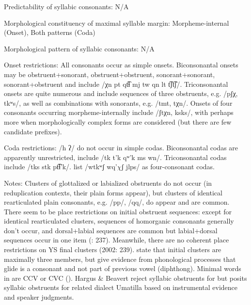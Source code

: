 {\begin{appendixdesc}
\item[Predictability of syllabic consonants:] N/A

\item[Morphological constituency of maximal syllable margin:] Morpheme-internal (Onset), Both patterns (Coda)

\item[Morphological pattern of syllabic consonants:] N/A

\item[Onset restrictions:] All consonants occur as simple onsets. Biconsonantal onsets may be obstruent+sonorant, obstruent+obstruent, sonorant+sonorant, sonorant+obstruent and include /χn pt qt͡ɬ mj tw qn lt t͡ʃt͡ʃ/. Triconsonantal onsets are quite numerous and include sequences of three obstruents, e.g. /pʃχ, tkʷs/, as well as combinations with sonorants, e.g. /tmt, tχn/. Onsets of four consonants occurring morpheme-internally include /ʃtχn, ksks/, with perhaps more when morphologically complex forms are considered (but there are few candidate prefixes).

\item[Coda restrictions:] /h ʔ/ do not occur in simple codas. Biconsonantal codas are apparently unrestricted, include /tk t’k qʷ'k ms wn/. Triconsonantal codas include /tks stk pt͡ɬ’k/. \citet{HargusBeavert2006} list /wtkʷʃ wq’$\chi ʃ$ jlps/ as four-consonant codas.

\item[Notes:] Clusters of glottalized or labialized obstruents do not occur (in reduplication contexts, their plain forms appear), but clusters of identical rearticulated plain consonants, e.g. /pp/, /qq/, do appear and are common. There seem to be place restrictions on initial obstruent sequences: except for identical rearticulated clusters, sequences of homorganic consonants generally don’t occur, and dorsal+labial sequences are common but labial+dorsal sequences occur in one item (\citealt{HargusBeavert2002}: 237). Meanwhile, there are no coherent place restrictions on YS final clusters (2002: 239). \citet{RigsbyRude1996} state that initial clusters are maximally three members, but \citet{HargusBeavert2006} give evidence from phonological processes that glide is a consonant and not part of previous vowel (diphthong). Minimal words in  are CCV or CVC (\citealt{HargusBeavert2006}). Hargus \& Beavert reject syllabic obstruents for  but \citet{Minthorn2005} posits syllabic obstruents for related dialect Umatilla based on instrumental evidence and speaker judgments.
\end{appendixdesc}
}
